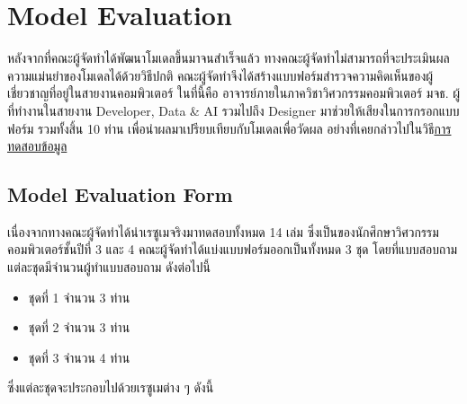 \section{Model Evaluation}
หลังจากที่คณะผู้จัดทำได้พัฒนาโมเดลขึ้นมาจนสำเร็จแล้ว ทางคณะผู้จัดทำไม่สามารถที่จะประเมินผลความแม่นยำของโมเดลได้ด้วยวิธีปกติ
คณะผู้จัดทำจึงได้สร้างแบบฟอร์มสำรวจความคิดเห็นของผู้เชี่ยวชาญที่อยู่ในสายงานคอมพิวเตอร์ ในที่นี้คือ อาจารย์ภายในภาควิชาวิศวกรรมคอมพิวเตอร์ มจธ.
ผู้ที่ทำงานในสายงาน Developer, Data \& AI รวมไปถึง Designer มาช่วยให้เสียงในการกรอกแบบฟอร์ม รวมทั้งสิ้น 10 ท่าน เพื่อนำผลมาเปรียบเทียบกับโมเดลเพื่อวัดผล
อย่างที่เคยกล่าวไปในวิธี\hyperref[subsec:Test Data]{การทดสอบข้อมูล}

\subsection{Model Evaluation Form}
เนื่องจากทางคณะผู้จัดทำได้นำเรซูเมจริงมาทดสอบทั้งหมด 14 เล่ม ซึ่งเป็นของนักศึกษาวิศวกรรมคอมพิวเตอร์ชั้นปีที่ 3 และ 4
คณะผู้จัดทำได้แบ่งแบบฟอร์มออกเป็นทั้งหมด 3 ชุด โดยที่แบบสอบถามแต่ละชุดมีจำนวนผู้ทำแบบสอบถาม ดังต่อไปนี้
\begin{itemize}
    \item ชุดที่ 1 จำนวน 3 ท่าน
    \item ชุดที่ 2 จำนวน 3 ท่าน
    \item ชุดที่ 3 จำนวน 4 ท่าน
\end{itemize}
ซึ่งแต่ละชุดจะประกอบไปด้วยเรซูเมต่าง ๆ ดังนี้

